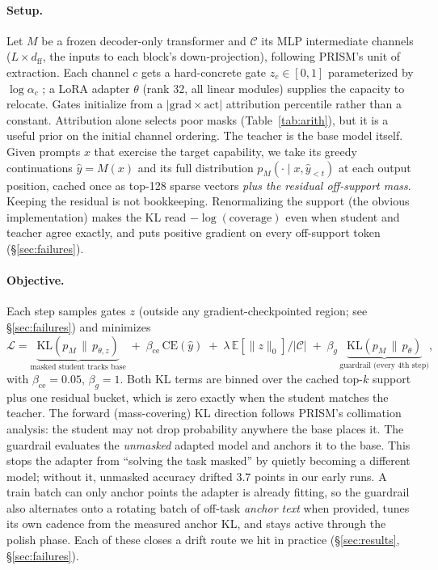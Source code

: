 \documentclass{article}
\begin{document}
\paragraph{Setup.} Let $M$ be a frozen decoder-only transformer and
$\mathcal{C}$ its MLP intermediate channels ($L \times d_\mathrm{ff}$, the
inputs to each block's down-projection), following PRISM's unit of
extraction. Each channel $c$ gets a hard-concrete gate $z_c \in [0,1]$
parameterized by $\log\alpha_c$ \citep{louizos2018, maddison2017concrete};
a LoRA adapter $\theta$ (rank 32, all linear modules) supplies the capacity
to relocate. Gates initialize from a $|\mathrm{grad}\times\mathrm{act}|$
attribution percentile rather than a constant. Attribution alone selects poor
masks (Table~\ref{tab:arith}), but it is a useful prior on the initial
channel ordering. The teacher is the base model itself. Given prompts $x$
that exercise the target capability, we take its greedy continuations
$\hat{y} = M(x)$ and its full distribution $p_M(\cdot \mid x, \hat y_{<t})$
at each output position, cached once as top-128 sparse vectors \emph{plus the
residual off-support mass}. Keeping the residual is not bookkeeping.
Renormalizing the support (the obvious implementation) makes the KL read
$-\log(\text{coverage})$ even when student and teacher agree exactly, and
puts positive gradient on every off-support token (\S\ref{sec:failures}).

\paragraph{Objective.} Each step samples gates $z$ (outside any
gradient-checkpointed region; see \S\ref{sec:failures}) and minimizes
\begin{equation}
\mathcal{L} =
\underbrace{\mathrm{KL}\!\left(p_M \,\|\, p_{\theta,z}\right)}_{\text{masked student tracks base}}
\;+\; \beta_\mathrm{ce}\,\mathrm{CE}(\hat y)
\;+\; \lambda \,\mathbb{E}\!\left[\|z\|_0\right]/|\mathcal{C}|
\;+\; \beta_g\,
\underbrace{\mathrm{KL}\!\left(p_M \,\|\, p_{\theta}\right)}_{\text{guardrail (every 4th step)}},
\end{equation}
with $\beta_\mathrm{ce}{=}0.05$, $\beta_g{=}1$. Both KL terms are binned over
the cached top-$k$ support plus one residual bucket, which is zero exactly
when the student matches the teacher. The forward (mass-covering) KL
direction follows PRISM's collimation analysis: the student may not drop
probability anywhere the base places it. The guardrail evaluates the
\emph{unmasked} adapted model and anchors it to the base. This stops the
adapter from ``solving the task masked'' by quietly becoming a different
model; without it, unmasked accuracy drifted 3.7 points in our early runs.
A train batch can only anchor points the adapter is already fitting, so the
guardrail also alternates onto a rotating batch of off-task \emph{anchor
text} when provided, tunes its own cadence from the measured anchor KL, and
stays active through the polish phase. Each of these closes a drift route we
hit in practice (\S\ref{sec:results}, \S\ref{sec:failures}).
\end{document}

